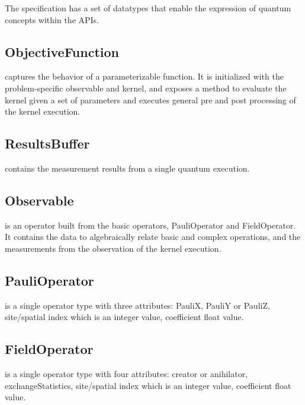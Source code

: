 The \qcor specification has a set of datatypes that enable the expression of quantum concepts within the \qcor \ac{API}s.\\

\subsection{\textbf{ObjectiveFunction}}\label{subsec:ObjectiveFunction}
 captures the behavior of a parameterizable function. It is initialized with the problem-specific observable and kernel, and exposes a method to evaluate the kernel given a set of parameters and executes general pre and post processing of the kernel execution.\\

\subsection{\textbf{ResultsBuffer}}\label{subsec:ResultsBuffer}
 contains the measurement results from a single quantum execution.\\

\subsection{\textbf{Observable}}\label{subsec:Observable}
 is an operator built from the basic operators, PauliOperator and FieldOperator. It contains the data to algebraically relate basic and complex operations, and the measurements from the observation of the kernel execution.\\

\subsection{\textbf{PauliOperator}}\label{subsec:PauliOperator}
 is a single operator type with three attributes: PauliX, PauliY or PauliZ, site/spatial index which is an integer value, coefficient float value.\\

\subsection{\textbf{FieldOperator}}\label{subsec:FieldOperator}
 is a single operator type with four attributes: creator or anihilator, exchangeStatistics, site/spatial index which is an integer value, coefficient float value.\\


